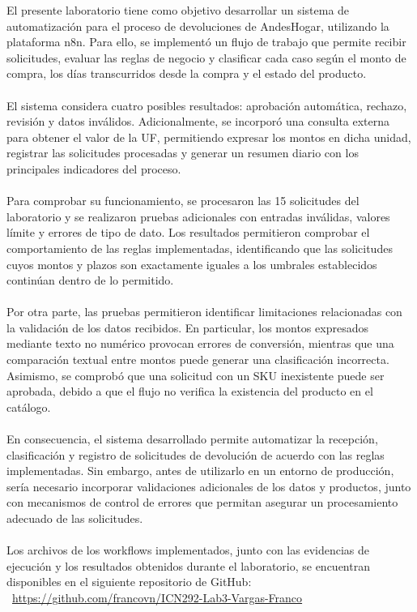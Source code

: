 \documentclass[12pt,a4paper]{article}
\begin{document}
\noindent El presente laboratorio tiene como objetivo desarrollar un sistema de automatización para el proceso de devoluciones de AndesHogar, utilizando la plataforma n8n. Para ello, se implementó un flujo de trabajo que permite recibir solicitudes, evaluar las reglas de negocio y clasificar cada caso según el monto de compra, los días transcurridos desde la compra y el estado del producto.
\\\\
\noindent El sistema considera cuatro posibles resultados: aprobación automática, rechazo, revisión y datos inválidos. Adicionalmente, se incorporó una consulta externa para obtener el valor de la UF, permitiendo expresar los montos en dicha unidad, registrar las solicitudes procesadas y generar un resumen diario con los principales indicadores del proceso.
\\\\
\noindent Para comprobar su funcionamiento, se procesaron las 15  solicitudes del laboratorio y se realizaron pruebas adicionales con entradas inválidas, valores límite y errores de tipo de dato. Los resultados permitieron comprobar el comportamiento de las reglas
implementadas, identificando que las solicitudes cuyos montos y plazos son exactamente iguales a los umbrales establecidos continúan dentro de lo permitido.
\\\\
\noindent Por otra parte, las pruebas permitieron identificar limitaciones relacionadas con la validación de los datos recibidos. En particular, los montos expresados mediante texto no numérico provocan errores de conversión, mientras que una comparación textual entre montos puede generar una clasificación incorrecta. Asimismo, se comprobó que una solicitud con un SKU inexistente puede ser aprobada, debido a que el flujo no verifica la existencia del producto en el catálogo.
\\\\
\noindent En consecuencia, el sistema desarrollado permite automatizar la recepción, clasificación y registro de solicitudes de devolución de acuerdo con las reglas implementadas. Sin embargo, antes de utilizarlo en un entorno de producción, sería necesario incorporar validaciones
adicionales de los datos y productos, junto con mecanismos de control de errores que permitan asegurar un procesamiento adecuado de las solicitudes.
\\\\
\noindent Los archivos de los workflows implementados, junto con las evidencias de ejecución y los resultados obtenidos durante el laboratorio, se encuentran disponibles en el siguiente repositorio de GitHub: \ \url{https://github.com/francovn/ICN292-Lab3-Vargas-Franco}
\end{document}
